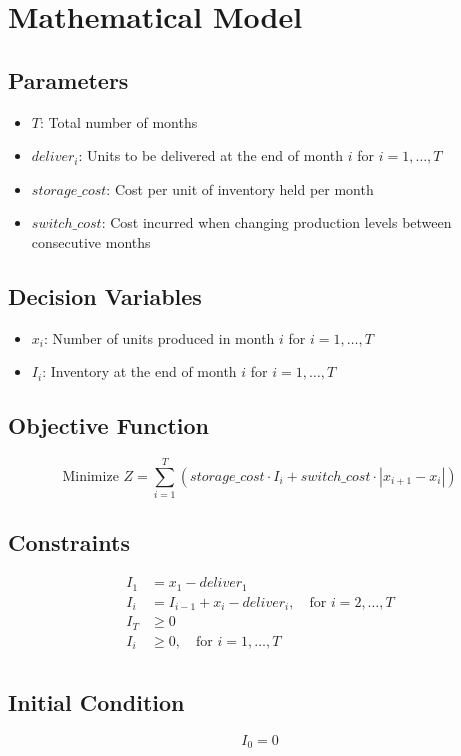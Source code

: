 \documentclass{article}
\begin{document}
\section*{Mathematical Model}

\subsection*{Parameters}
\begin{itemize}
    \item $T$: Total number of months
    \item $deliver_i$: Units to be delivered at the end of month $i$ for $i = 1, \ldots, T$
    \item $storage\_cost$: Cost per unit of inventory held per month
    \item $switch\_cost$: Cost incurred when changing production levels between consecutive months
\end{itemize}

\subsection*{Decision Variables}
\begin{itemize}
    \item $x_i$: Number of units produced in month $i$ for $i = 1, \ldots, T$
    \item $I_i$: Inventory at the end of month $i$ for $i = 1, \ldots, T$
\end{itemize}

\subsection*{Objective Function}
\[
\text{Minimize } Z = \sum_{i=1}^{T} (storage\_cost \cdot I_i + switch\_cost \cdot |x_{i+1} - x_i|) 
\]

\subsection*{Constraints}
\begin{align*}
    I_1 & = x_1 - deliver_1 \\
    I_i & = I_{i-1} + x_i - deliver_i, \quad \text{for } i = 2, \ldots, T \\
    I_T & \geq 0 \\
    I_i & \geq 0, \quad \text{for } i = 1, \ldots, T \\
\end{align*}

\subsection*{Initial Condition}
\[
I_0 = 0
\]
\end{document}
